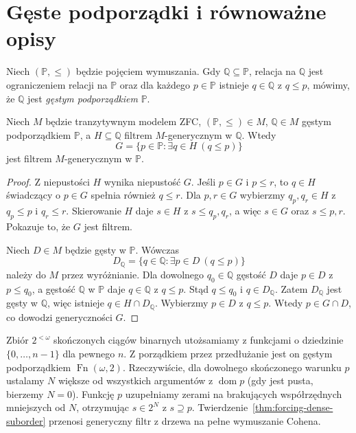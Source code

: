 \section{Gęste podporządki i równoważne opisy}
\begin{definicja}
\label{def:forcing-dense-suborder}
Niech $(\mathbb P,\leq)$ będzie pojęciem wymuszania.
Gdy $\mathbb Q\subseteq\mathbb P$,
relacja na $\mathbb Q$ jest
ograniczeniem relacji na $\mathbb P$
oraz dla każdego $p\in\mathbb P$
istnieje $q\in\mathbb Q$ z $q\leq p$,
mówimy, że $\mathbb Q$ jest
\emph{gęstym podporządkiem} $\mathbb P$.
\end{definicja}

\begin{twierdzenie}
\label{thm:forcing-dense-suborder}
Niech $M$ będzie tranzytywnym modelem ZFC,
$(\mathbb P,\leq)\in M$, $\mathbb Q\in M$
gęstym podporządkiem $\mathbb P$,
a $H\subseteq\mathbb Q$ filtrem
$M$-generycznym w $\mathbb Q$.
Wtedy
\[
 G=\{p\in\mathbb P:\exists q\in H\ (q\leq p)\}
\]
jest filtrem $M$-generycznym w $\mathbb P$.
\end{twierdzenie}
\begin{proof}
Z niepustości $H$ wynika niepustość $G$.
Jeśli $p\in G$ i $p\leq r$, to
$q\in H$ świadczący o $p\in G$
spełnia również $q\leq r$.
Dla $p,r\in G$ wybierzmy
$q_p,q_r\in H$ z $q_p\leq p$
i $q_r\leq r$. Skierowanie $H$
daje $s\in H$ z $s\leq q_p,q_r$,
a więc $s\in G$ oraz $s\leq p,r$.
Pokazuje to, że $G$ jest filtrem.

Niech $D\in M$ będzie gęsty
w $\mathbb P$. Wówczas
\[
 D_{\mathbb Q}=
 \{q\in\mathbb Q:\exists p\in D\ (q\leq p)\}
\]
należy do $M$ przez wyróżnianie.
Dla dowolnego $q_0\in\mathbb Q$
gęstość $D$ daje $p\in D$ z
$p\leq q_0$, a gęstość $\mathbb Q$
w $\mathbb P$ daje $q\in\mathbb Q$
z $q\leq p$. Stąd
$q\leq q_0$ i $q\in D_{\mathbb Q}$.
Zatem $D_{\mathbb Q}$ jest gęsty
w $\mathbb Q$, więc istnieje
$q\in H\cap D_{\mathbb Q}$.
Wybierzmy $p\in D$ z $q\leq p$.
Wtedy $p\in G\cap D$, co dowodzi
generyczności $G$.
\end{proof}

\begin{przyklad}
\label{ex:forcing-binary-tree}
Zbiór $2^{<\omega}$ skończonych
ciągów binarnych utożsamiamy
z funkcjami o dziedzinie
$\{0,\dots,n-1\}$ dla pewnego $n$.
Z porządkiem przez przedłużanie
jest on gęstym podporządkiem
$\operatorname{Fn}(\omega,2)$.
Rzeczywiście, dla dowolnego
skończonego warunku $p$ ustalamy
$N$ większe od wszystkich argumentów
z $\operatorname{dom}p$ (gdy jest pusta,
bierzemy $N=0$). Funkcję $p$
uzupełniamy zerami na brakujących
współrzędnych mniejszych od $N$,
otrzymując $s\in2^N$ z $s\supseteq p$.
Twierdzenie~\ref{thm:forcing-dense-suborder}
przenosi generyczny filtr z drzewa
na pełne wymuszanie Cohena.
\end{przyklad}

